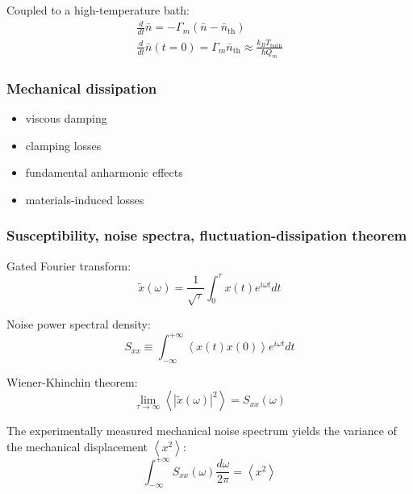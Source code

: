 \documentclass[8pt,a4paper,twocolumn]{article} %
\numberwithin{equation}{section} %
\begin{document}
			Coupled to a high-temperature bath:
				\begin{gather}
					\frac{d}{dt}\bar n = -\Gamma_m (\bar n-\bar n_{\text{th}})\\
					\frac{d}{dt}\bar n(t=0) = \Gamma_m \bar n_{\text{th}}\approx \frac{k_B T_{\text{bath}} }{\hbar Q_m}
				\end{gather}

			\subsubsection{Mechanical dissipation} %
			\label{ssub:mechanical_dissipation}
				
				\begin{itemize}
					\item viscous damping
					\item clamping losses
					\item fundamental anharmonic effects
					\item materials-induced losses
				\end{itemize}

			\subsubsection{Susceptibility, noise spectra, fluctuation-dissipation theorem} %
			\label{ssub:susceptibility_noise_spectra_fluctuation_dissipation_theorem}
				Gated Fourier transform:
				\begin{equation}
					\tilde x(\omega)=\frac{1}{\sqrt \tau} \int_0^ \tau x(t)e^{i \omega t }dt
				\end{equation}

				Noise power spectral density:
				\begin{equation}
					S_{xx}\equiv \int_{-\infty}^{+\infty} \left< x(t)x(0) \right> e^{i \omega t}dt
				\end{equation}

				Wiener-Khinchin theorem:
				\begin{equation}
					\lim_{\tau\rightarrow \infty} \left<\left|\tilde x(\omega) \right|^2\right>=S_{xx}(\omega)
				\end{equation}

				The experimentally measured mechanical noise spectrum yields the variance of the mechanical displacement $\left< x^2\right>$:
				\begin{equation}
					\int_{-\infty}^{+\infty} S_{xx}(\omega)\frac{d \omega}{2 \pi}=\left< x^2\right>
				\end{equation}
\end{document}
